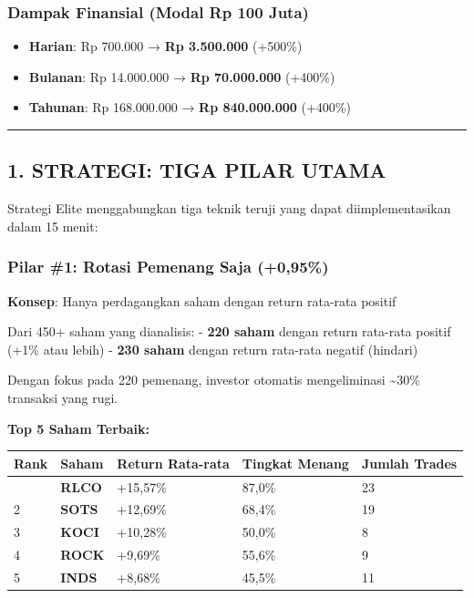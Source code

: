 \documentclass[
  10pt,
  a4paper,
]{article}
\providecommand{\tightlist}{%
  \setlength{\itemsep}{0pt}\setlength{\parskip}{0pt}}\usepackage{longtable,booktabs,array}
\begin{document}
\subsubsection{Dampak Finansial (Modal Rp 100
Juta)}\label{dampak-finansial-modal-rp-100-juta}

\begin{itemize}
\tightlist
\item
  \textbf{Harian}: Rp 700.000 → \textbf{Rp 3.500.000} (+500\%)
\item
  \textbf{Bulanan}: Rp 14.000.000 → \textbf{Rp 70.000.000} (+400\%)\\
\item
  \textbf{Tahunan}: Rp 168.000.000 → \textbf{Rp 840.000.000} (+400\%)
\end{itemize}

\vspace{0.3cm}

\begin{center}\rule{0.5\linewidth}{0.5pt}\end{center}

\subsection{1. STRATEGI: TIGA PILAR
UTAMA}\label{strategi-tiga-pilar-utama}

Strategi Elite menggabungkan tiga teknik teruji yang dapat
diimplementasikan dalam 15 menit:

\subsubsection{Pilar \#1: Rotasi Pemenang Saja
(+0,95\%)}\label{pilar-1-rotasi-pemenang-saja-095}

\textbf{Konsep}: Hanya perdagangkan saham dengan return rata-rata
positif

Dari 450+ saham yang dianalisis: - \textbf{220 saham} dengan return
rata-rata positif (+1\% atau lebih) - \textbf{230 saham} dengan return
rata-rata negatif (hindari)

Dengan fokus pada 220 pemenang, investor otomatis mengeliminasi
\textasciitilde30\% transaksi yang rugi.

\textbf{Top 5 Saham Terbaik:}

\begin{longtable}[]{@{}lllll@{}}
\toprule\noalign{}
Rank & Saham & Return Rata-rata & Tingkat Menang & Jumlah Trades \\
\midrule\noalign{}
\endhead
\bottomrule\noalign{}
\endlastfoot
1 & \textbf{RLCO} & +15,57\% & 87,0\% & 23 \\
2 & \textbf{SOTS} & +12,69\% & 68,4\% & 19 \\
3 & \textbf{KOCI} & +10,28\% & 50,0\% & 8 \\
4 & \textbf{ROCK} & +9,69\% & 55,6\% & 9 \\
5 & \textbf{INDS} & +8,68\% & 45,5\% & 11 \\
\end{longtable}
\end{document}
